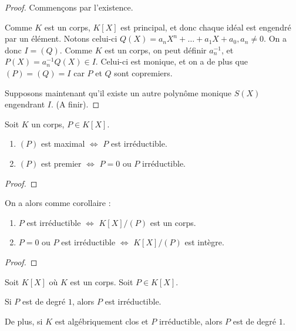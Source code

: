 \ifdefined\outputproof
\begin{proof}
	Commençons par l'existence.

	Comme $K$ est un corps, $K[X]$ est principal, et donc chaque idéal est
	engendré par un élément. Notons celui-ci $Q(X) = a_{n}X^{n} + \ldots +
	a_{1}X + a_{0}, a_{n} \ne 0$. On a donc $I = (Q)$. Comme $K$ est un corps, on peut
	définir $a_{n}^{-1}$, et $P(X) = a_{n}^{-1}Q(X) \in I$. Celui-ci est
	monique, et on a de plus que $(P) = (Q) = I$ car $P$ et $Q$ sont copremiers.

	Supposons maintenant qu'il existe un autre polynôme monique $S(X)$
	engendrant $I$. (A finir).
\end{proof}
\fi

\begin{proposition}
	Soit $K$ un corps, $P \in K[X]$.
	\begin{enumerate}
		\item $(P)$ est maximal $\Leftrightarrow$ $P$ est irréductible.
		\item $(P)$ est premier $\Leftrightarrow$ $P = 0$ ou $P$
			irréductible.
	\end{enumerate}
\end{proposition}

\ifdefined\outputproof
\begin{proof}

\end{proof}
\fi

On a alors comme corollaire :

\begin{corollary}
	\begin{enumerate}
		\item $P$ est irréductible $\Leftrightarrow$ $K[X]/(P)$ est un corps.
		\item $P = 0$ ou $P$ est irréductible $\Leftrightarrow$ $K[X]/(P)$ est
			intègre.
	\end{enumerate}
\end{corollary}

\ifdefined\outputproof
\begin{proof}

\end{proof}
\fi

\begin{proposition}
	Soit $K[X]$ où $K$ est un corps. Soit $P \in K[X]$.

	Si $P$ est de degré $1$, alors $P$ est irréductible.

	De plus, si $K$ est algébriquement clos et $P$ irréductible, alors $P$ est
	de degré $1$.
\end{proposition}

